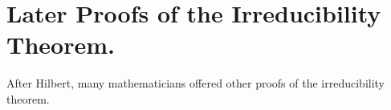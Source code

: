 \documentclass{article}
\theoremstyle{plain}
\theoremstyle{definition}
\newcommand{\Zed}{\mathbb{Z}}   %
\begin{document}

\section{Later Proofs of the Irreducibility Theorem.}
\label{sec:later}
After Hilbert, many mathematicians offered other proofs of the
irreducibility theorem.

%
%
%
\end{document}
